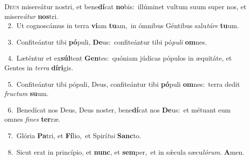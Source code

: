 \lettrine{\initial\textcolor{\initialcolor}{D}}{eus} misereátur nostri, et bene\-\textbf{dí}\-cat \textbf{no}\-bis:~\star illúminet vultum suum super nos, et misere\-\textit{á}\-\textit{tur} \textbf{nos}\-tri.\\
{\numbfont\textcolor{\numbcolor}{~2.}}~Ut cognoscámus in terra \textbf{vi}\-am \textbf{tu}\-am,~\star in ómnibus Géntibus salu\-\textit{tá}\-\textit{re} \textbf{tu}\-um.\par
{\numbfont\textcolor{\numbcolor}{~3.}}~Confiteántur tibi \textbf{pó}\-puli, \textbf{De}\-us:~\star confiteántur tibi pó\-\textit{pu}\-\textit{li} \textbf{om}\-nes.\par
{\numbfont\textcolor{\numbcolor}{~4.}}~Læténtur et ex\-\textbf{súl}\-tent \textbf{Gen}\-tes:~\star quóniam júdicas pópulos in æquitáte, et Gentes in \textit{ter}\-\textit{ra} \textbf{dí}\-\textbf{ri}gis.\par
{\numbfont\textcolor{\numbcolor}{~5.}}~Confiteántur tibi pópuli, Deus, confiteántur tibi \textbf{pó}\-puli \textbf{om}\-nes:~\star terra dedit \textit{fruc}\-\textit{tum} \textbf{su}\-um.\par
{\numbfont\textcolor{\numbcolor}{~6.}}~Benedícat nos Deus, Deus noster, bene\-\textbf{dí}\-cat nos \textbf{De}\-us:~\star et métuant eum omnes \textit{fi}\-\textit{nes} \textbf{ter}\-ræ.\par
{\numbfont\textcolor{\numbcolor}{~7.}}~Glória \textbf{Pa}\-tri, et \textbf{Fí}\-lio,~\star et Spirí\-\textit{tu}\-\textit{i} \textbf{Sanc}\-to.\par
{\numbfont\textcolor{\numbcolor}{~8.}}~Sicut erat in princípio, et \textbf{nunc}\-, et \textbf{sem}\-per,~\star et in sǽcula sæcu\-\textit{ló}\-\textit{rum}. \textbf{A}\-men.\par

